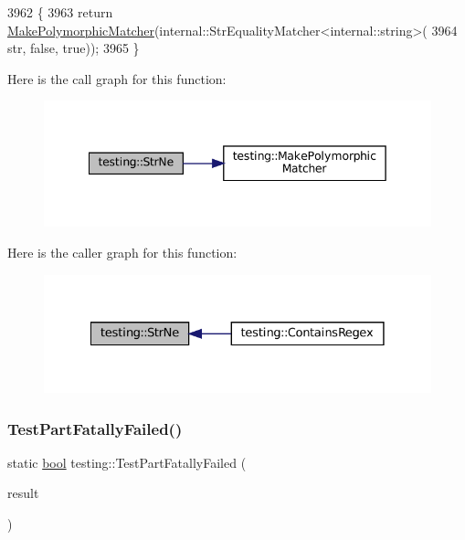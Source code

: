 \begin{DoxyCode}
3962                                      \{
3963   \textcolor{keywordflow}{return} \hyperlink{namespacetesting_a667ca94f190ec2e17ee2fbfdb7d3da04}{MakePolymorphicMatcher}(internal::StrEqualityMatcher<internal::string>(
3964       str, \textcolor{keyword}{false}, \textcolor{keyword}{true}));
3965 \}
\end{DoxyCode}
Here is the call graph for this function\+:
\nopagebreak
\begin{figure}[H]
\begin{center}
\leavevmode
\includegraphics[width=342pt]{namespacetesting_a6f6b8af3d19cb969df0eb995c47a14d2_cgraph}
\end{center}
\end{figure}
Here is the caller graph for this function\+:
\nopagebreak
\begin{figure}[H]
\begin{center}
\leavevmode
\includegraphics[width=328pt]{namespacetesting_a6f6b8af3d19cb969df0eb995c47a14d2_icgraph}
\end{center}
\end{figure}
\mbox{\label{namespacetesting_a9f19442d566c7eaec0702b9fcf282b63}} 
\subsubsection{\texorpdfstring{Test\+Part\+Fatally\+Failed()}{TestPartFatallyFailed()}}
{\footnotesize\ttfamily static \hyperlink{classbool}{bool} testing\+::\+Test\+Part\+Fatally\+Failed (\begin{DoxyParamCaption}\item[{const \hyperlink{classtesting_1_1TestPartResult}{Test\+Part\+Result} \&}]{result }\end{DoxyParamCaption})\hspace{0.3cm}{\ttfamily [static]}}



